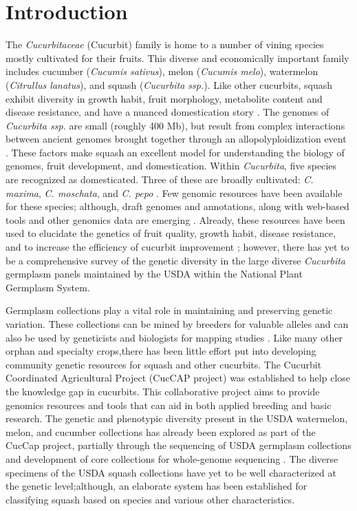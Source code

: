 \documentclass[utf8]{FrontiersinHarvard} %
\begin{document}
\section{Introduction}

The \emph{Cucurbitaceae} (Cucurbit) family is home to a number of vining species
mostly cultivated for their fruits.
This diverse and economically important family includes cucumber (\emph{Cucumis sativus}), melon (\emph{Cucumis melo}), watermelon (\emph{Citrullus lanatus}), and squash (\emph{Cucurbita ssp.})\citep{Ferriol}.
Like other cucurbits, squash exhibit diversity in growth habit, fruit morphology, metabolite content and disease resistance, and have a nuanced domestication story \citep{Chomicki2020,Paris2005}.
The genomes of \emph{Cucurbita ssp.} are small (roughly 400 Mb), but result from complex interactions between ancient genomes brought together through an allopolyploidization event \citep{Sun2017}.
These factors make squash an excellent model for understanding the biology of genomes, fruit development, and domestication.
Within \emph{Cucurbita}, five species are recognized as domesticated.
Three of these are broadly cultivated: \emph{C. maxima}, \emph{C. moschata}, and \emph{C. pepo} \citep{Ferriol}.
Few genomic resources have been available for these species; although, draft genomes and annotations, along with web-based tools and other genomics data are emerging \citep{Yu2022}.
Already, these resources have been used to elucidate the genetics of fruit quality, growth habit, disease resistance, and to increase the efficiency of cucurbit improvement \citep{MonteroPau2017,Zhong2017,Kazminska2018,Wu2019,Xanthopoulou2019,Hernandez2020}; however, there has yet to be a comprehensive survey of the genetic diversity in the large diverse \emph{Cucurbita} germplasm panels maintained by the USDA within the National Plant Germplasm System.

Germplasm collections play a vital role in maintaining and preserving genetic variation.
These collections can be mined by breeders for valuable alleles and can also be used by geneticists and biologists for mapping studies \citep{McCouch2020}.
Like many other orphan and specialty crops,there has been little effort put into developing community genetic resources for squash and other cucurbits.
The Cucurbit Coordinated Agricultural Project (CucCAP project) was established to help close the knowledge gap in cucurbits.
This collaborative project aims to provide genomics resources and tools that can aid in both applied breeding and basic research.
The genetic and phenotypic diversity present in the USDA watermelon, melon, and cucumber collections has already been explored as part of the CucCap project, partially through the sequencing of USDA germplasm collections and development of core collections for whole-genome sequencing \citep{Wang2021,Wang2018,Wu2019a}.
The diverse specimens of the USDA squash collections have yet to be well characterized at the genetic level;although, an elaborate system has been established for classifying squash based on species and various other characteristics.
\end{document}
